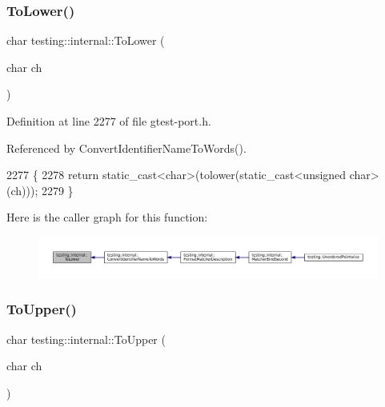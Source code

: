 \subsubsection{\texorpdfstring{To\+Lower()}{ToLower()}}
{\footnotesize\ttfamily char testing\+::internal\+::\+To\+Lower (\begin{DoxyParamCaption}\item[{char}]{ch }\end{DoxyParamCaption})\hspace{0.3cm}{\ttfamily [inline]}}



Definition at line 2277 of file gtest-\/port.\+h.



Referenced by Convert\+Identifier\+Name\+To\+Words().


\begin{DoxyCode}
2277                              \{
2278   \textcolor{keywordflow}{return} \textcolor{keyword}{static\_cast<}\textcolor{keywordtype}{char}\textcolor{keyword}{>}(tolower(static\_cast<unsigned char>(ch)));
2279 \}
\end{DoxyCode}
Here is the caller graph for this function\+:
\nopagebreak
\begin{figure}[H]
\begin{center}
\leavevmode
\includegraphics[width=350pt]{namespacetesting_1_1internal_ad9c627ef2a94245e3fd69e7ab3d49b42_icgraph}
\end{center}
\end{figure}
\mbox{\label{namespacetesting_1_1internal_ac1b876a8133895bd553d4780ecaa1e3a}} 
\subsubsection{\texorpdfstring{To\+Upper()}{ToUpper()}}
{\footnotesize\ttfamily char testing\+::internal\+::\+To\+Upper (\begin{DoxyParamCaption}\item[{char}]{ch }\end{DoxyParamCaption})\hspace{0.3cm}{\ttfamily [inline]}}



